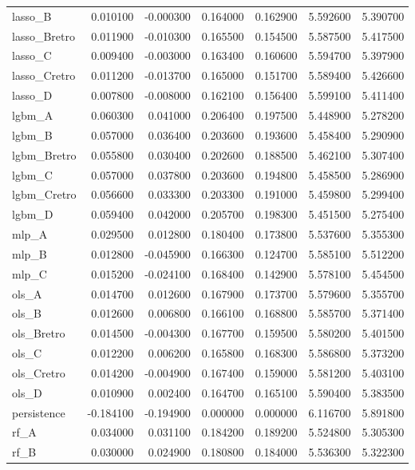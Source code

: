 \begin{tabular}{lrrrrrr}
lasso_B & 0.010100 & -0.000300 & 0.164000 & 0.162900 & 5.592600 & 5.390700 \\
lasso_Bretro & 0.011900 & -0.010300 & 0.165500 & 0.154500 & 5.587500 & 5.417500 \\
lasso_C & 0.009400 & -0.003000 & 0.163400 & 0.160600 & 5.594700 & 5.397900 \\
lasso_Cretro & 0.011200 & -0.013700 & 0.165000 & 0.151700 & 5.589400 & 5.426600 \\
lasso_D & 0.007800 & -0.008000 & 0.162100 & 0.156400 & 5.599100 & 5.411400 \\
lgbm_A & 0.060300 & 0.041000 & 0.206400 & 0.197500 & 5.448900 & 5.278200 \\
lgbm_B & 0.057000 & 0.036400 & 0.203600 & 0.193600 & 5.458400 & 5.290900 \\
lgbm_Bretro & 0.055800 & 0.030400 & 0.202600 & 0.188500 & 5.462100 & 5.307400 \\
lgbm_C & 0.057000 & 0.037800 & 0.203600 & 0.194800 & 5.458500 & 5.286900 \\
lgbm_Cretro & 0.056600 & 0.033300 & 0.203300 & 0.191000 & 5.459800 & 5.299400 \\
lgbm_D & 0.059400 & 0.042000 & 0.205700 & 0.198300 & 5.451500 & 5.275400 \\
mlp_A & 0.029500 & 0.012800 & 0.180400 & 0.173800 & 5.537600 & 5.355300 \\
mlp_B & 0.012800 & -0.045900 & 0.166300 & 0.124700 & 5.585100 & 5.512200 \\
mlp_C & 0.015200 & -0.024100 & 0.168400 & 0.142900 & 5.578100 & 5.454500 \\
ols_A & 0.014700 & 0.012600 & 0.167900 & 0.173700 & 5.579600 & 5.355700 \\
ols_B & 0.012600 & 0.006800 & 0.166100 & 0.168800 & 5.585700 & 5.371400 \\
ols_Bretro & 0.014500 & -0.004300 & 0.167700 & 0.159500 & 5.580200 & 5.401500 \\
ols_C & 0.012200 & 0.006200 & 0.165800 & 0.168300 & 5.586800 & 5.373200 \\
ols_Cretro & 0.014200 & -0.004900 & 0.167400 & 0.159000 & 5.581200 & 5.403100 \\
ols_D & 0.010900 & 0.002400 & 0.164700 & 0.165100 & 5.590400 & 5.383500 \\
persistence & -0.184100 & -0.194900 & 0.000000 & 0.000000 & 6.116700 & 5.891800 \\
rf_A & 0.034000 & 0.031100 & 0.184200 & 0.189200 & 5.524800 & 5.305300 \\
rf_B & 0.030000 & 0.024900 & 0.180800 & 0.184000 & 5.536300 & 5.322300 \\

\end{tabular}

